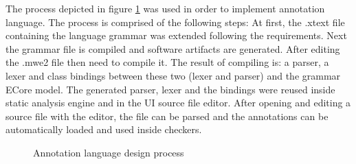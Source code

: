 The process depicted in figure \ref{figure:Language_Design_Process} was used in order to
implement annotation language. The process is
comprised of the following steps: At first, the .xtext file
containing the language grammar was extended following the requirements. Next the grammar file is compiled and software artifacts are generated. After editing the .mwe2 file then need to compile it. The result of compiling is: a parser, a lexer and class bindings between these two (lexer and parser) and the grammar ECore model. The generated parser, lexer and the bindings were reused inside static analysis engine and in the UI source file editor. After opening and editing a source file with the editor, the file can be parsed and the annotations can be automatically loaded and used inside checkers.
\begin{figure}[htbp]
	\centering
	\caption{Annotation language design process}
	\label{figure:Language_Design_Process}
\end{figure}